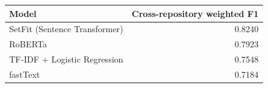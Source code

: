 \begin{tabular}{lr}
\toprule
Model & Cross-repository weighted F1 \\
\midrule
SetFit (Sentence Transformer) & 0.8240 \\
RoBERTa & 0.7923 \\
TF-IDF + Logistic Regression & 0.7548 \\
fastText & 0.7184 \\
\bottomrule
\end{tabular}
